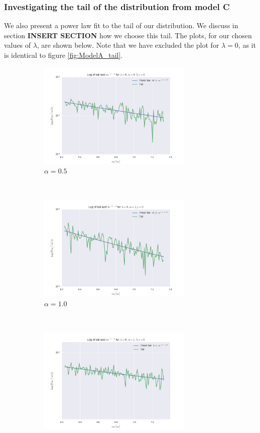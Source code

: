 \documentclass[a4paper, 10pt]{article}
\begin{document}
\subsubsection{Investigating the tail of the distribution from model C}
We also present a power law fit to the tail of our distribution. We discuss in section \textbf{INSERT SECTION} how we choose this tail. The plots, for our chosen values of $\lambda$, are shown below. Note that we have excluded the plot for $\lambda = 0$, as it is identical to figure \ref{fig:ModelA_tail}.
\begin{figure}[!ht] %
    \begin{subfigure}[H!]{0.5\textwidth}
        \centering
        \includegraphics[height=2.0in]{tailL0A05G0.png} %
        \caption{$\alpha = 0.5$}
    \end{subfigure}%
    ~ 
    \begin{subfigure}[H!]{0.5\textwidth}
        \centering
        \includegraphics[height=2.0in]{tailL0A1G0.png}
        \caption{$\alpha = 1.0$}
    \end{subfigure}
     ~
    \begin{subfigure}[H!]{0.5\textwidth}
        \centering
        \includegraphics[height=2.0in]{tailL0A15G0.png}

\end{subfigure}
\end{figure}
\end{document}
